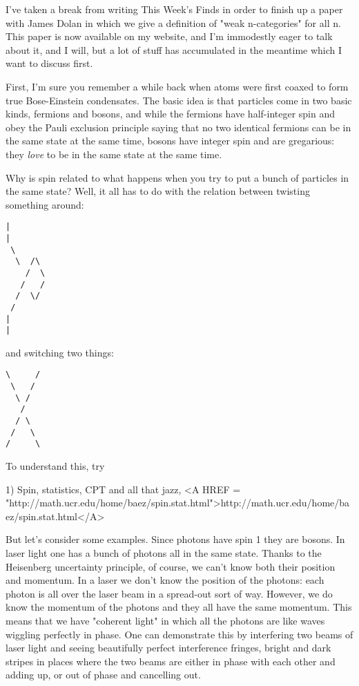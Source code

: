 



I've taken a break from writing This Week's Finds in order to
finish up a paper with James Dolan in which we give a definition of
"weak n-categories" for all n.  This paper is now available
on my website, and I'm immodestly eager to talk about it, and I will,
but a lot of stuff has accumulated in the meantime which I want to
discuss first.

First, I'm sure you remember a while back when atoms were first coaxed
to form true Bose-Einstein condensates.  The basic idea is that
particles come in two basic kinds, fermions and bosons, and while the
fermions have half-integer spin and obey the Pauli exclusion principle
saying that no two identical fermions can be in the same state at the
same time, bosons have integer spin and are gregarious: they \emph{love} to
be in the same state at the same time.

Why is spin related to what happens when you try to put a bunch of
particles in the same state?  Well, it all has to do with the relation
between twisting something around:

\begin{verbatim}
|
|
 \
  \  /\
    /  \
   /   /
  /  \/
 /
|
|

\end{verbatim}
    
and switching two things:

\begin{verbatim}
\     /
 \   /
  \ /
   /
  / \
 /   \
/     \

\end{verbatim}
    
To understand this, try

1) Spin, statistics, CPT and all that jazz,  <A HREF = "http://math.ucr.edu/home/baez/spin.stat.html">http://math.ucr.edu/home/baez/spin.stat.html</A>

But let's consider some examples.  Since photons have spin 1 they are
bosons.  In laser light one has a bunch of photons all in the
same state.  Thanks to the Heisenberg uncertainty principle, of
course, we can't know both their position and momentum.  In a laser we
don't know the position of the photons: each photon is all over the
laser beam in a spread-out sort of way.  However, we do know the
momentum of the photons and they all have the same momentum.  This
means that we have "coherent light" in which all the photons are like
waves wiggling perfectly in phase.  One can demonstrate this by
interfering two beams of laser light and seeing beautifully perfect
interference fringes, bright and dark stripes in places where the two
beams are either in phase with each other and adding up, or out of
phase and cancelling out.

